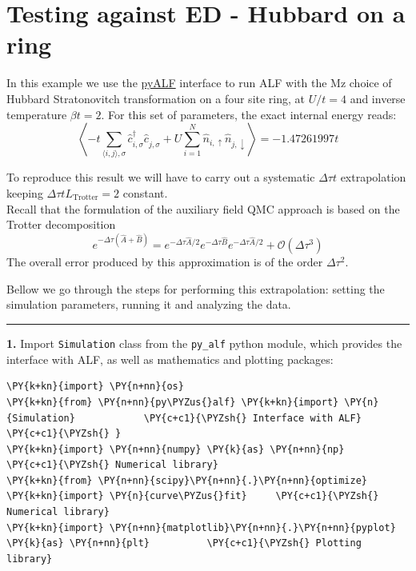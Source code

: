     
    

    
    \hypertarget{testing-against-ed---hubbard-on-a-ring}{%
\section{Testing against ED - Hubbard on a
ring}\label{testing-against-ed---hubbard-on-a-ring}}

    In this example we use the
\href{https://git.physik.uni-wuerzburg.de/ALF/pyALF/-/tree/ALF-2.2}{pyALF}
interface to run ALF with the Mz choice of Hubbard Stratonovitch
transformation on a four site ring, at \(U/t=4\) and inverse temperature
\(\beta t = 2\). For this set of parameters, the exact internal energy
reads:\\
\[
 \left\langle -t \sum_{\langle i,j\rangle, \sigma} \hat{c}_{i,\sigma}^{\dagger} \hat{c}_{j,\sigma}^{\phantom\dagger}   +  U  \sum_{i=1}^{N} \hat{n}_{i,\uparrow}\hat{n}_{j,\downarrow}  \right\rangle  =   -1.47261997 t 
\]

To reproduce this result we will have to carry out a systematic
\(\Delta \tau t\) extrapolation keeping
\(\Delta \tau t L_\text{Trotter} = 2\) constant.\\
Recall that the formulation of the auxiliary field QMC approach is based
on the Trotter decomposition \[
e^{ -\Delta \tau \left( \hat{A} + \hat{B} \right) }  =  e^{ -\Delta \tau \hat{A}/2}  e^{ -\Delta \tau  \hat{B}  }   e^{ -\Delta \tau \hat{A}/2}  +  \mathcal{O} \left (\Delta  \tau^3\right)
\] The overall error produced by this approximation is of the order
\(\Delta \tau^2\).

Bellow we go through the steps for performing this extrapolation:
setting the simulation parameters, running it and analyzing the data.

\begin{center}\rule{0.5\linewidth}{0.5pt}\end{center}

\textbf{1.} Import \texttt{Simulation} class from the \texttt{py\_alf}
python module, which provides the interface with ALF, as well as
mathematics and plotting packages:

    \begin{tcolorbox}[breakable, size=fbox, boxrule=1pt, pad at break*=1mm,colback=cellbackground, colframe=cellborder]
\begin{Verbatim}[commandchars=\\\{\}]
\PY{k+kn}{import} \PY{n+nn}{os}
\PY{k+kn}{from} \PY{n+nn}{py\PYZus{}alf} \PY{k+kn}{import} \PY{n}{Simulation}            \PY{c+c1}{\PYZsh{} Interface with ALF}
\PY{c+c1}{\PYZsh{} }
\PY{k+kn}{import} \PY{n+nn}{numpy} \PY{k}{as} \PY{n+nn}{np}                       \PY{c+c1}{\PYZsh{} Numerical library}
\PY{k+kn}{from} \PY{n+nn}{scipy}\PY{n+nn}{.}\PY{n+nn}{optimize} \PY{k+kn}{import} \PY{n}{curve\PYZus{}fit}     \PY{c+c1}{\PYZsh{} Numerical library}
\PY{k+kn}{import} \PY{n+nn}{matplotlib}\PY{n+nn}{.}\PY{n+nn}{pyplot} \PY{k}{as} \PY{n+nn}{plt}          \PY{c+c1}{\PYZsh{} Plotting library}
\end{Verbatim}
\end{tcolorbox}

